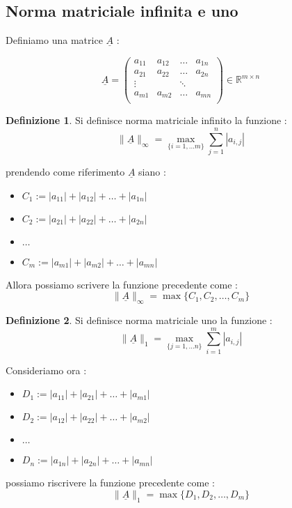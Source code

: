 \documentclass[12pt, a4paper]{book}
\theoremstyle{definition}
\newtheorem{defn}{Definizione}[section]
\newcommand{\VarMtrx}[1]{\ensuremath{\underline{#1}}}
\begin{document}
\subsection{Norma matriciale infinita e uno}
\begin{flushleft}

Definiamo una matrice $\VarMtrx{A}$ : 

\[
		\VarMtrx{A} = 
								\begin{pmatrix} 
								a_{11} & a_{12} & \dots &  a_{1n} \\  
								a_{21} & a_{22} & \dots &  a_{2n} \\
								\vdots &			 & \ddots	&				\\
								a_{m1} & a_{m2} & \dots &  a_{mn} \\
								\end{pmatrix} 
		\in \mathbb{R}^{m \times n}			
\]

\begin{defn}
Si definisce norma matriciale infinito la funzione :
\[ \lVert\VarMtrx{A}\rVert_{\infty} = \max_{\{i=1,...m\}} \sum_{j=1}^{n} |a_{i,j}| \]
\end{defn}

prendendo come riferimento \VarMtrx{A} siano : 
\begin{itemize}
	\item $C_{1} := |a_{11}| + |a_{12}| + \dots + |a_{1n}|$
	\item $C_{2} := |a_{21}| + |a_{22}| + \dots + |a_{2n}|$
	\item $\dots$
	\item  $C_{m} := |a_{m1}| + |a_{m2}| + \dots + |a_{mn}|$
\end{itemize}

Allora possiamo scrivere la funzione precedente come : 
\[ \lVert\VarMtrx{A}\rVert_{\infty} = \max \{ C_{1}, C_{2}, \dots,  C_{m}\}\]

\newpage
\begin{defn}
Si definisce norma matriciale uno la funzione :
\[ \lVert\VarMtrx{A}\rVert_{1} = \max_{\{j=1,...n\}} \sum_{i=1}^{m} |a_{i,j}| \]
\end{defn}

Consideriamo ora : 
\begin{itemize}
	\item  $D_{1} := |a_{11}| + |a_{21}| + \dots + |a_{m1}|$
	\item  $D_{2} := |a_{12}| + |a_{22}| + \dots + |a_{m2}|$
	\item $\dots$
	\item  $D_{n} := |a_{1n}| + |a_{2n}| + \dots + |a_{mn}|$
\end{itemize}

possiamo riscrivere la funzione precedente come : 
\[ \lVert\VarMtrx{A}\rVert_{1} = \max \{ D_{1}, D_{2}, \dots,  D_{m}\}\]
\end{flushleft}
\end{document}
